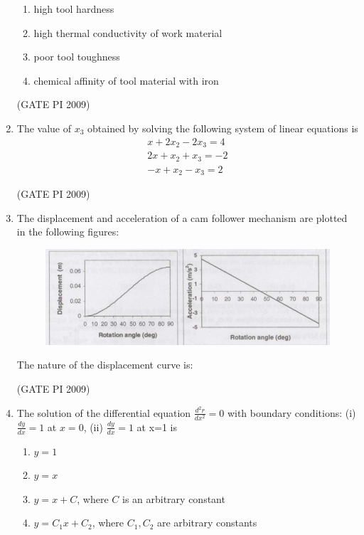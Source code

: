 \documentclass[journal,12pt,onecolumn]{IEEEtran}
\theoremstyle{remark}
\begin{document}
\begin{enumerate}[label=Q.\arabic*]
\begin{enumerate}[label=(\Alph*)]
\item high tool hardness
\item high thermal conductivity of work material
\item poor tool toughness
\item chemical affinity of tool material with iron
\end{enumerate}
\hfill (GATE PI 2009)
\item The value of $x_3$ obtained by solving the following system of linear equations is
\begin{align*} 
x + 2x_2 - 2x_3 = 4 \\ 
2x + x_2 + x_3 = -2 \\
-x + x_2 - x_3 = 2
\end{align*}
\begin{enumerate}[label=(\Alph*)]
\end{enumerate}
\hfill (GATE PI 2009)
\item The displacement and acceleration of a cam follower mechanism are plotted in the following figures:

\begin{figure}[h]
    \centering
    \includegraphics[width=0.5\linewidth]{figs/1.png}
    \label{fig:placeholder}
\end{figure} 
The nature of the displacement curve is:
\begin{enumerate}[label=(\Alph*)]
\end{enumerate}
\hfill (GATE PI 2009)
\item The solution of the differential equation
$
\frac{d^2 r}{dx^2} = 0
$
with boundary conditions: (i) $\frac{dy}{dx} = 1$ at $x = 0$, (ii) $\frac{dy}{dx} = 1$ at x=1 is
\begin{enumerate}[label=(\Alph*)]
\item $y = 1$ 
\item $y = x$ 
\item $y = x + C$, where $C$ is an arbitrary constant  
\item $y = C_1 x + C_2$, where $C_1, C_2$ are arbitrary constants 


\end{enumerate}
\end{enumerate}
\end{document}
